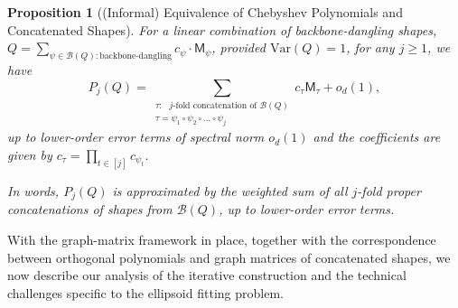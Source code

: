 \documentclass[12pt]{article}
\def \al {\alpha}
\newcommand{\Var}{\mathrm{Var}}
\newtheorem{proposition}[theorem]{Proposition}
\newcommand{\calB}{\mathcal{B}}
\newcommand{\cm}{\mathsf{M} }
\begin{document}
\begin{proposition}[(Informal) Equivalence of Chebyshev Polynomials and Concatenated Shapes]
For a linear combination of backbone-dangling shapes, $Q = \sum_{\psi \in \calB(Q) : \text{backbone-dangling} } c_\psi  \cdot \cm_\psi$, provided $\Var(Q) =1$,
 for any $j\geq 1$,  we have
\[
    P_j(Q)
    =
    \sum_{\substack{\tau:\text{ \(j\)-fold concatenation of }\calB(Q) \\ \tau =\psi_1\circ \psi_2\circ \ldots \circ \psi_j} }
    c_\tau \cm_\tau + o_d(1),
\]  
up to lower-order error terms of spectral norm $o_d(1)$ and the coefficients are given by \(
c_\tau = \prod_{t\in [j]} c_{\psi_t} \).

In words,   \(P_j(Q)\) is approximated by the
weighted sum of all \(j\)-fold proper concatenations of shapes from
\(\calB(Q)\), up to lower-order error terms.

\end{proposition}

With the graph-matrix framework in place, together with the correspondence between orthogonal polynomials and graph matrices of concatenated shapes, we now describe our analysis of the iterative construction and the technical challenges specific to the ellipsoid fitting problem. %
\end{document}
